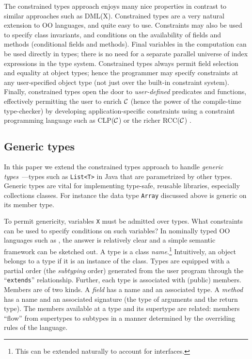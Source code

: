 The constrained types approach enjoys many nice properties in contrast
to similar approaches such as DML(X)\cite{xi99dependent}.  Constrained
types are a very natural extension to OO languages, and quite easy to
use. Constraints may also be used to specify class invariants, and
conditions on the availability of fields and methods (conditional
fields and methods).  Final variables in the computation can be used
directly in types; there is no need for a separate parallel universe
of index expressions in the type system.  Constrained types always
permit field selection and equality at object types; hence the
programmer may specify constraints at any user-specified object type
(not just over the built-in constraint system).  Finally, constrained
types open the door to {\em user-defined} predicates and functions,
effectively permitting the user to enrich $\cal C$ (hence the power of
the compile-time type-checker) by developing application-specific
constraints using a constraint programming language such as CLP($\cal
C$) \cite{clp} or the richer RCC($\cal C$) \cite{rc}.

\subsection{Generic types}

In this paper we extend the constrained types approach to handle {\em
generic
types}~\cite{clu,ada,GJ,java-popl97,thorup97,Java3,csharp-generics}---types such as {\tt List<T>} in Java that are parametrized by other
types. Generic types are vital for implementing type-safe, reusable
libraries, especially collections classes. For instance the data type
{\tt Array} discussed above is generic on its member type.

To permit genericity, variables {\tt X} must be admitted over types.
What constraints can be used to specify conditions on such variables?
In nominally typed OO languages such as \Java, the answer is
relatively clear and a simple semantic framework can be sketched out.
A type is a class {\em name}.\footnote{This can be extended naturally
to account for interfaces.} Intuitively, an object belongs to a type
if it is an instance of the class. Types are equipped with a partial
order (the {\em subtyping} order) generated from the user program
through the ``{\tt extends}'' relationship.  Further, each type is
associated with (public) members. Members are of two kinds.  A {\em
field} has a name and an associated type. A {\em method} has a name
and an associated signature (the type of arguments and the return
type).  The members available at a type and its supertype are related:
members ``flow'' from supertypes to subtypes in a manner determined by
the overriding rules of the language.

